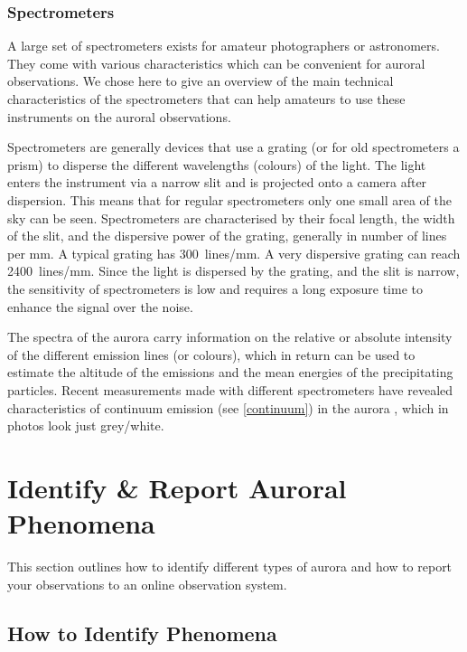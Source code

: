 \documentclass{article}
\renewcommand{\cite}[1]{\parencite{#1}}
\begin{document}
\subsubsection{Spectrometers}
A large set of spectrometers exists for amateur photographers or astronomers. They come with various characteristics which can be convenient for auroral observations. We chose here to give an overview of the main technical characteristics of the spectrometers that can help amateurs to use these instruments on the auroral observations.

Spectrometers are generally devices that use a grating (or for old spectrometers a prism) to disperse the different wavelengths (colours) of the light. The light enters the instrument via a narrow slit and is projected onto a camera after dispersion. This means that for regular spectrometers only one small area of the sky can be seen. 
Spectrometers are characterised by their focal length, the width of the slit, and the dispersive power of the grating, generally in number of lines per mm. A typical grating has 300~lines/mm. A very dispersive grating can reach 2400~lines/mm. Since the light is dispersed by the grating, and the slit is narrow, the sensitivity of spectrometers is low and requires a long exposure time to enhance the signal over the noise.

The spectra of the aurora carry information on the relative or absolute intensity of the different emission lines (or colours), which in return can be used to estimate the altitude of the emissions and the mean energies of the precipitating particles. Recent measurements made with different spectrometers have revealed characteristics of continuum emission (see \ref{continuum}) in the aurora \cite{Gillies2019}, which in photos look just grey/white.



\section{Identify \& Report Auroral Phenomena}
This section outlines how to identify different types of aurora and how to report your observations to an online observation system.

\subsection{How to Identify Phenomena} \
\end{document}
